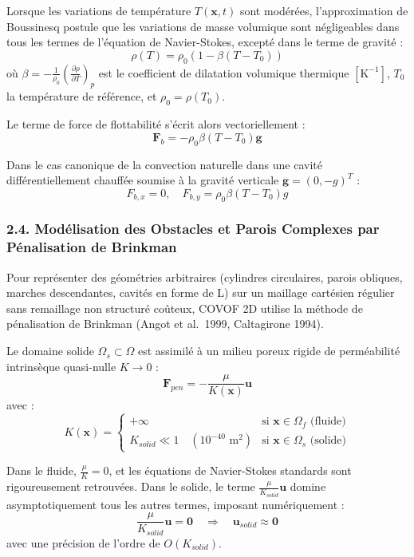 \documentclass[
  french,
]{article}
\begin{document}
Lorsque les variations de température \(T(\mathbf{x}, t)\) sont
modérées, l'approximation de Boussinesq postule que les variations de
masse volumique sont négligeables dans tous les termes de l'équation de
Navier-Stokes, excepté dans le terme de gravité :
\[\rho(T) = \rho_0 \left( 1 - \beta (T - T_0) \right)\] où
\(\beta = -\frac{1}{\rho_0} \left( \frac{\partial \rho}{\partial T} \right)_p\)
est le coefficient de dilatation volumique thermique
\([\text{K}^{-1}]\), \(T_0\) la température de référence, et
\(\rho_0 = \rho(T_0)\).

Le terme de force de flottabilité s'écrit alors vectoriellement :
\[\mathbf{F}_b = -\rho_0 \beta (T - T_0) \mathbf{g}\]

Dans le cas canonique de la convection naturelle dans une cavité
différentiellement chauffée soumise à la gravité verticale
\(\mathbf{g} = (0, -g)^T\) :
\[F_{b, x} = 0, \quad F_{b, y} = \rho_0 \beta (T - T_0) g\]

\subsubsection{2.4. Modélisation des Obstacles et Parois Complexes par
Pénalisation de
Brinkman}\label{moduxe9lisation-des-obstacles-et-parois-complexes-par-puxe9nalisation-de-brinkman}

Pour représenter des géométries arbitraires (cylindres circulaires,
parois obliques, marches descendantes, cavités en forme de L) sur un
maillage cartésien régulier sans remaillage non structuré coûteux, COVOF
2D utilise la méthode de pénalisation de Brinkman (Angot et al.~1999,
Caltagirone 1994).

Le domaine solide \(\Omega_s \subset \Omega\) est assimilé à un milieu
poreux rigide de perméabilité intrinsèque quasi-nulle \(K \to 0\) :
\[\mathbf{F}_{pen} = - \frac{\mu}{K(\mathbf{x})} \mathbf{u}\] avec :
\[K(\mathbf{x}) = \begin{cases} +\infty & \text{si } \mathbf{x} \in \Omega_f \text{ (fluide)} \\ K_{solid} \ll 1 \quad (10^{-40}\text{ m}^2) & \text{si } \mathbf{x} \in \Omega_s \text{ (solide)} \end{cases}\]

Dans le fluide, \(\frac{\mu}{K} = 0\), et les équations de Navier-Stokes
standards sont rigoureusement retrouvées. Dans le solide, le terme
\(\frac{\mu}{K_{solid}} \mathbf{u}\) domine asymptotiquement tous les
autres termes, imposant numériquement :
\[\frac{\mu}{K_{solid}} \mathbf{u} = \mathbf{0} \quad \Longrightarrow \quad \mathbf{u}_{solid} \approx \mathbf{0}\]
avec une précision de l'ordre de \(O(K_{solid})\).
\end{document}

